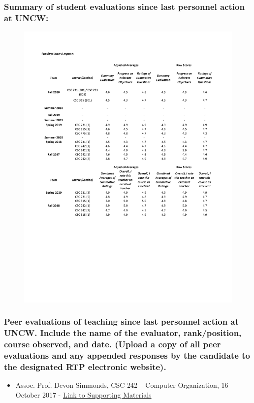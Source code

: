 \documentclass[10pt]{article}
\begin{document}
\subsubsection{Summary of student evaluations since last personnel action at UNCW:}
\begin{figure}[!h]
	\includegraphics[scale=1.0]{IDEASummaryTable}
\end{figure}


\subsubsection{Peer evaluations of teaching  since last personnel action at UNCW. Include the name of the evaluator, rank/position, course observed, and date. (Upload a copy of all peer evaluations and any appended responses by the candidate to the designated RTP electronic website).}

\begin{itemize}
    \item Assoc. Prof. Devon Simmonds, CSC 242 – Computer Organization, 16 October 2017 - \hyperref[Fall 2017 Peer Observation]{Link to Supporting Materials}
\end{itemize}
\end{document}
